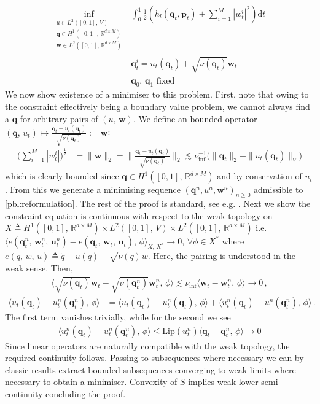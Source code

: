\documentclass[runningheads]{llncs}
\newcommand{\half}{\frac 12}
\newcommand{\norm}[2]{\| #1 \|_{ #2 }}
\newcommand{\vnorm}[1]{\norm{ #1 }{V}}
\newcommand{\ltwonorm}[1]{\norm{ #1 }{2}}
\newcommand{\diff}[1]{\text{d} #1}
\newcommand{\RdM}{\mathbb{R}^{d\times M}}
\newcommand{\nuinf}{\nu_\text{inf}}
\begin{document}
\begin{align}
\inf_{\substack{u \in L^2([0,1],\,V)\\ \mathbf q\in H^1([0,1],\,\RdM)\\\mathbf w\in L^2([0,1],\,\RdM)}}
    & \int_0^1\half\left (h_l(\mathbf q_t,\mathbf p_t) + \sum_{i=1}^M |w_t^i|^2\right )\diff{t}\\
    & \dot{\mathbf q_t^i} = u_t(\mathbf q_t) + \sqrt{\nu(\mathbf q_t)} \mathbf w_t\\
    & \mathbf q_0,\,\mathbf q_1\text{ fixed}
  \label{pbl:reformulation}
\end{align}
We now show existence of a minimiser to this problem. First, note that owing to
the constraint effectively being a boundary value problem, we cannot always find
a $\mathbf q$ for arbitrary pairs of $(u,\,\mathbf w)$. We define an bounded operator
$(\mathbf q,\, u_t)\mapsto \frac{\dot{\mathbf q_t} - u_t(\mathbf q_t)}{\sqrt{\nu(\mathbf q_t)}} := \mathbf w$:
\begin{align*}
\Big(\sum_{i=1}^M |w_t^i|\Big)^{\frac 12} & = \ltwonorm{\mathbf w} =
\ltwonorm{\frac{\dot{\mathbf q}_t - u_t(\mathbf q_t)}{\sqrt{\nu(\mathbf q_t)}}}
\lesssim \nuinf^{-1}\Big(\ltwonorm{\dot{\mathbf q}_t} + \vnorm{u_t(\mathbf
q_t)}\Big)
\end{align*}
which is clearly bounded since $\mathbf q\in H^1([0,1],\,\RdM)$ and by
conservation of $u_t$. From this we generate a minimising sequence $(\mathbf q^n,
u^n, \mathbf w^n)_{n\geq 0}$ admissible to \eqref{pbl:reformulation}. The rest
of the proof is standard, see e.g. \cite{younes2010shapes}. Next we show the
constraint equation is continuous with respect to the weak topology on
$X\triangleq H^1([0,1],\,\RdM)\times L^2([0,1],\,V)\times L^2([0,1],\,\RdM)$ i.e.
$\langle e(\mathbf q_t^n,\,\mathbf w_t^n,\,\mathbf u_t^n)-e(\mathbf q_t,\,\mathbf
w_t,\,\mathbf u_t),\,\phi\rangle_{X,\,X^*}\rightarrow 0$, $\forall \phi\in X^*$
where $e(q,\,w,\,u) \triangleq \dot{q} - u(q) - \sqrt{\nu(q)}w$. Here, the
pairing is understood in the weak sense. Then,
\begin{align*}
\langle\sqrt{\nu(\mathbf q_t)}\mathbf w_t - \sqrt{\nu(\mathbf q_t^n)}\mathbf w_t^n,\,\phi\rangle \lesssim \nuinf\langle
\mathbf w_t - \mathbf w_t^n,\,\phi\rangle \rightarrow 0\,,
\end{align*}
\begin{align*}
\langle u_t(\mathbf q_t)-u_t^n(\mathbf q_t^n),\,\phi\rangle & = \langle
u_t(\mathbf q_t)- u_t^n(\mathbf q_t),\,\phi\rangle + \langle u_t^n(\mathbf
q_t)-u^n(\mathbf q_t^n),\,\phi\rangle\,.
\end{align*}
The first term vanishes trivially, while for the second we see
\begin{align*}
\langle u_t^n(\mathbf q_t)-u_t^n(\mathbf q_t^n),\,\phi\rangle \leq \text{Lip}(u_t^n)\langle \mathbf q_t-\mathbf q_t^n,\,\phi\rangle \rightarrow 0
\end{align*}
Since linear operators are naturally compatible with the weak topology, the
required continuity follows.  Passing to subsequences where necessary we can by
classic results extract bounded subsequences converging to weak limits where
necessary to obtain a minimiser. Convexity of $S$ implies weak lower
semi-continuity concluding the proof.
\end{document}
